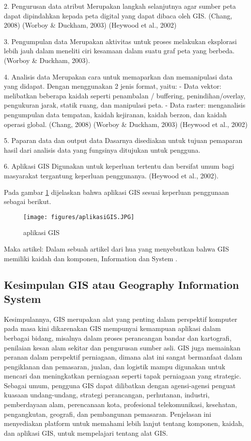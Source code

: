 2. Pengurusan data atribut
Merupakan langkah selanjutnya agar sumber peta dapat dipindahkan kepada peta digital yang dapat dibaca oleh GIS.
(Chang, 2008) (Worboy \& Duckham, 2003) (Heywood et al., 2002)

3. Pengumpulan data
Merupakan aktivitas untuk proses melakukan eksplorasi lebih jauh dalam meneliti ciri kesamaan dalam suatu graf peta yang berbeda. (Worboy \& Duckham, 2003).

4. Analisis data
Merupakan cara untuk memaparkan dan memanipulasi data yang didapat. Dengan menggunakan 2 jenis format, yaitu:
- Data vektor: melibatkan beberapa kaidah seperti penambalan / buffering, penindihan/overlay, pengukuran jarak, statik ruang, dan manipulasi peta.
- Data raster: menganalisis pengumpulan data tempatan, kaidah kejiranan, kaidah berzon, dan kaidah operasi global.
(Chang, 2008) (Worboy \& Duckham, 2003) (Heywood et al., 2002)

5. Paparan data dan output data
Dasarnya disediakan untuk tujuan pemaparan hasil dari analisis data yang fungsinya ditujukan untuk pengguna.

6. Aplikasi GIS
Digunakan untuk keperluan tertentu dan bersifat umum bagi masyarakat tergantung keperluan penggunanya. 
(Heywood et al., 2002).

Pada gambar \ref{aplikasi GIS} dijelaskan bahwa aplikasi GIS sesuai keperluan penggunaan sebagai berikut.
\begin{figure}[ht]
	\centerline{\texttt{[image: figures/aplikasiGIS.JPG]}}
	\caption{aplikasi GIS}
	\label{aplikasi GIS}
	\end{figure}
Maka artikel:
	Dalam sebuah artikel dari hua yang menyebutkan bahwa GIS memiliki kaidah dan komponen, Information dan System \cite{hua2017sistem}.

\subsection{Kesimpulan GIS atau Geography Information System}
Kesimpulannya, GIS merupakan alat yang penting dalam perspektif komputer pada masa kini dikarenakan GIS
mempunyai kemampuan aplikasi dalam berbagai bidang, misalnya dalam proses perancangan bandar dan kartografi,
penilaian kesan alam sekitar dan pengurusan sumber asli. GIS juga memainkan peranan dalam perspektif perniagaan,
dimana alat ini sangat bermanfaat dalam pengiklanan dan pemasaran, jualan, dan logistik 
mampu digunakan untuk mencari dan meningkatkan perniagaan seperti tapak perniagaan yang strategic. Sebagai umum, pengguna GIS dapat dilibatkan dengan agensi-agensi penguat kuasaan undang-undang, strategi
perancangan, perhutanan, industri, pemberdayaan alam, perencanaan kota, profesional
telekomunikasi, kesehatan, pengangkutan, geografi, dan pembangunan pemasaran. 
Penjelasan ini menyediakan platform untuk memahami lebih lanjut tentang komponen, kaidah, dan aplikasi GIS, 
untuk mempelajari tentang alat GIS.
